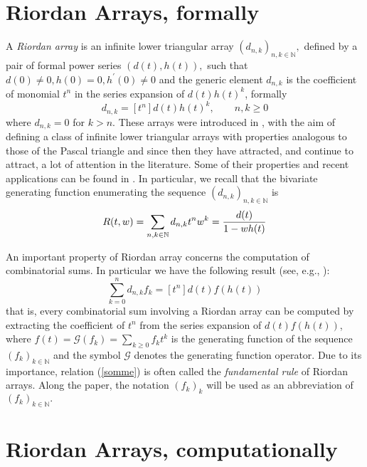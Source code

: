 
\section{Riordan Arrays, formally}

A \textit{Riordan array} is an infinite lower triangular array
$(d_{n,k} )_{n,k \in \mathbb{N}},$ defined by a pair of formal power series
$(d(t),h(t)),$ such that $d(0)\neq 0, h(0)=0, h^\prime(0)\neq0$ and the generic
element $d_{n,k}$ is the coefficient of monomial $t^{n}$ in the series
expansion of $d(t)h(t)^{k}$, formally
\begin{displaymath}
    d_{n,k}=[t^n]d(t)h(t)^k, \qquad n,k \geq 0
\end{displaymath}
where $d_{n,k}=0$ for $k>n.$ These arrays were introduced in
\citep{SHAPIRO1991229}, with the aim of defining a class of infinite lower
triangular arrays with properties analogous to those of the Pascal triangle and
since then they have attracted, and continue to attract, a lot of attention in
the literature. Some of their properties  and recent applications can be found
in \citep{LUZON201475,MRSV97}. In particular, we recall that the bivariate generating
function enumerating the sequence $(d_{n,k} )_{n,k \in\mathbb{N}}$ is
\begin{equation}
    \label{bgf}
    R(t,w) = \sum_{n,k \in\mathbb{N}}{d_{n,k} t^n w^k} = {d(t) \over 1-wh(t)}
\end{equation}

An important property of Riordan array concerns the computation of
combinatorial sums.  In particular we have the following result (see, e.g.,
\citep{LUZON2012631,Merlini:2009:CSI:2653507.2654195,SPRUGNOLI1994267}):
\begin{equation}
    \label{somme}
    \sum_{k=0}^n d_{n,k}f_k=[t^n]d(t)f(h(t))
\end{equation}
that is, every combinatorial sum involving a Riordan array can be computed by
extracting the coefficient of $t^n$ from the series expansion of $d(t)f(h(t))$,
where $f(t)=\mathcal{G}(f_k)=\sum_{k\geq 0}f_kt^k$ is the generating function of the
sequence $(f_k)_{k \in\mathbb{N}}$ and the symbol $\mathcal{G}$ denotes the generating function
operator. Due to its importance, relation (\ref{somme}) is often called the
\textit{fundamental rule} of Riordan arrays.  Along the paper, the notation
$(f_k)_{k}$ will be used as an abbreviation of $(f_k)_{k\in\mathbb{N}}.$

\section{Riordan Arrays, computationally}

